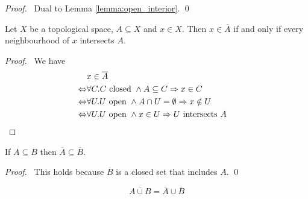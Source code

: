 \begin{proof}
    \pf\ Dual to Lemma \ref{lemma:open_interior}. \qed
\end{proof}

\begin{theorem}
    \label{theorem:closure_neighbourhood}
    Let $X$ be a topological space, $A \subseteq X$ and $x \in X$. Then $x \in \overline{A}$ if and only if
    every neighbourhood of $x$ intersects $A$.
\end{theorem}

\begin{proof}
    \pf\ We have
    \begin{align*}
        & x \in \overline{A} \\
        \Leftrightarrow & \forall C. C \text{ closed } \wedge A \subseteq C \Rightarrow x \in C \\
        \Leftrightarrow & \forall U. U \text{ open } \wedge A \cap U = \emptyset \Rightarrow x \notin U \\
        \Leftrightarrow & \forall U. U \text{ open } \wedge x \in U \Rightarrow U \text{ intersects } A & \qed
    \end{align*}
\end{proof}

\begin{proposition}
    \label{proposition:closure_monotone}
    If $A \subseteq B$ then $\overline{A} \subseteq \overline{B}$.
\end{proposition}

\begin{proof}
    \pf\ This holds because $\overline{B}$ is a closed set that includes $A$. \qed
\end{proof}

\begin{proposition}
    \[ \overline{A \cup B} = \overline{A} \cup \overline{B} \]
\end{proposition}

